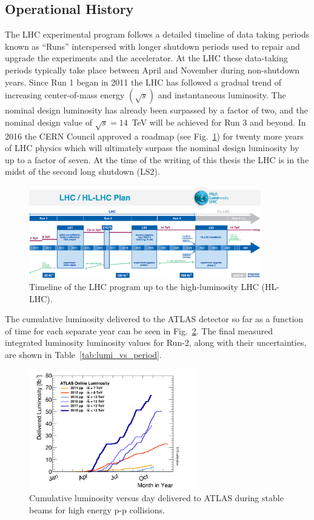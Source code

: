 \subsection{Operational History}
The LHC experimental program follows a detailed timeline of data taking periods known as ``Runs'' interspersed with longer shutdown periods used to repair and upgrade the experiments and the accelerator.
At the LHC these data-taking periods typically take place between April and November during non-shutdown years.
Since Run 1 began in 2011 the LHC has followed a gradual trend of increasing center-of-mass energy $(\sqrt{s})$ and instantaneous luminosity.
The nominal design luminosity has already been surpassed by a factor of two, and the nominal design value of $\sqrt{s} = 14$\ TeV will be achieved for Run 3 and beyond.
In 2016 the CERN Council approved a roadmap (see Fig.~\ref{fig:lhc_timeline}) for twenty more years of LHC physics which will ultimately surpass the nominal design luminosity by up to a factor of seven.
At the time of the writing of this thesis the LHC is in the midst of the second long shutdown (LS2).

\begin{figure}
	\centering
	\includegraphics[width=0.9\textwidth]{lhc_timeline}
	\caption{Timeline of the LHC program up to the high-luminosity LHC (HL-LHC).}
	\label{fig:lhc_timeline}
\end{figure}

The cumulative luminosity delivered to the ATLAS detector so far as a function of time for each separate year can be seen in Fig.~\ref{fig:int_lumi_vs_year}.
The final measured integrated luminosity luminosity values for Run-2, along with their uncertainties, are shown in Table~\ref{tab:lumi_vs_period}.


\begin{figure}
	\centering
	\includegraphics[width=0.65\textwidth]{int_lumi_vs_year}
	\caption{Cumulative luminosity versus day delivered to ATLAS during stable beams for high energy p-p collisions.}
	\label{fig:int_lumi_vs_year}
\end{figure}

